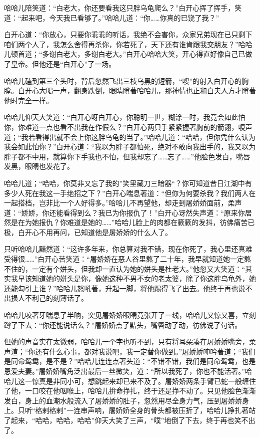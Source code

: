 \documentclass[12pt,oneside]{book}
\begin{document}
哈哈儿陪笑道：``白老大，你还要看我这只胖乌龟爬么？''白开心挥了挥手，笑道：``起来吧，今天我已看够了。''哈哈儿道：``你\ldots\ldots 你真的已饶了我？''

白开心道：``你放心，只要你乖乖的听话，我绝不会害你，众家兄弟现在已只剩下咱们两个人了，我怎么舍得再杀你，你若死了，天下还有谁肯跟我交朋友？''哈哈儿顿首道；``多谢白老大，多谢白老大。''白开心哈哈大笑，开心得直好像自己已做了皇帝。但他还是``白开心''了一场。

哈哈儿磕到第三个头时，背后忽然飞出三枝乌黑的短箭，``嗖''的射入白开心的胸膛。白开心大喝一声，翻身跌倒，眼睛瞪著哈哈儿，那神情也正和白夫人方才瞪著他时完全一样。

哈哈儿仰天大笑道：``白开心呀白开心，你聪明一世，糊涂一时，我竟会如此怕你，你难道一点也看不出我在作假么？''白开心两只手紧紧握著胸前的箭翎，嗄声道；``我若看得出就不会上你这胖乌龟的当了。''哈哈儿道：``哈哈，但你凭什么认为我会如此怕你？''白开心道：``我以为胖子都怕死，绝对不敢向我出手的，我又以为胖子都不中用，就算你下手我也不怕，但我却忘了\ldots\ldots 忘了\ldots\ldots{}''他脸色发白，嘴唇发黑，眼睛也发花了。

哈哈儿道；``哈哈，你莫非又忘了我的''笑里藏刀三暗器``？你可知道昔日江湖中有多少人死在我这一手绝招之下？''白开心喘息著道：``但你为何要杀我？我们两人在一起搭档，岂非比一个人好得多。''哈哈儿不再望他，却走到屠娇娇面前，柔声道：``娇娇，你还能看得到么？我已为你报仇了！''白开心讶然失声道：``原来你居然是在为她报仇？你难道是她的\ldots\ldots{}''哈哈儿脸上的肉都在簌簌的发抖，彷佛痛苦已极，白开心不用再问，已知道他是屠娇娇的什么人了。

只听哈哈儿黯然道：``这许多年来，你总算对我不错，现在你死了，我心里还真难受得很\ldots\ldots{}''白开心苦笑道：``屠娇娇在恶人谷里熬了二十年，我早就知道她一定熬不住的，一定有个姘头，但我却一直认为她的姘头是杜老大。''他忽又大笑道：``其实我早该知道她的姘头是你，像她这种不男不女的老太婆，除了你这胖乌龟外，她还能勾引上谁？''哈哈儿怒吼著，升起一脚，将他踢得飞了出去。他终于再也说不出损人不利己的刻薄话了。

哈哈儿咬著牙喘息了半晌，突见屠娇娇眼睛竟张开了一线，哈哈儿又惊又喜，立刻蹲了下去：``你还能说话么？''屠娇娇点了黠头，嘴唇动了动，彷佛说了句话。

但她的声音实在太微弱，哈哈儿一个字也听不到，只有将耳朵凑在屠娇娇嘴旁，柔声渲；``你还有什么心事，都对我说吧，我一定替你做到。''屠娇娇呻吟著道；``我们是同命鸳鸯，是不是？''哈哈儿连连点著头道：``不错不错，我们是同命鸳鸯，也是恩爱夫妻。''屠娇娇嘴角泛出最后一丝微笑，道：``所以我死了，你也不能活著。''哈哈儿这一惊真是非同小可，想跳起来却已来不及了。屠娇娇两条手臂已蛇一般缠住了他，一口咬在他咽喉上，哈哈儿拚命挣扎，终于还是挣不动了。只见他脸色渐渐发白，身上的血潮水般流入了屠娇娇的肚子，忽然用尽全身力气，压到屠娇娇身上。只听``格剌格剌''一连串声响，屠娇娇全身的骨头都被压折了，哈哈儿挣扎著站了起来，``哈哈，哈哈，哈哈''仰天大笑了三声，``噗''地倒了下去，终于再也笑不出了。
\end{document}
